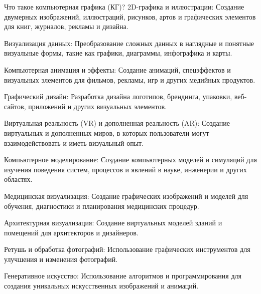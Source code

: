 \documentclass{beamer}
\begin{document}
\begin{frame}{Что такое компьютерная графика (КГ)?}
		2D-графика и иллюстрации: Создание двумерных изображений, иллюстраций, рисунков, артов и графических элементов для книг, журналов, рекламы и дизайна.
		
		Визуализация данных: Преобразование сложных данных в наглядные и понятные визуальные формы, такие как графики, диаграммы, инфографика и карты.
		
		Компьютерная анимация и эффекты: Создание анимаций, спецэффектов и визуальных элементов для фильмов, рекламы, игр и других медийных продуктов.
		
		Графический дизайн: Разработка дизайна логотипов, брендинга, упаковки, веб-сайтов, приложений и других визуальных элементов.
		
		Виртуальная реальность (VR) и дополненная реальность (AR): Создание виртуальных и дополненных миров, в которых пользователи могут взаимодействовать и иметь визуальный опыт.
		
		Компьютерное моделирование: Создание компьютерных моделей и симуляций для изучения поведения систем, процессов и явлений в науке, инженерии и других областях.
		
		Медицинская визуализация: Создание графических изображений и моделей для обучения, диагностики и планирования медицинских процедур.
		
		Архитектурная визуализация: Создание виртуальных моделей зданий и помещений для архитекторов и дизайнеров.
		
		Ретушь и обработка фотографий: Использование графических инструментов для улучшения и изменения фотографий.
		
		Генеративное искусство: Использование алгоритмов и программирования для создания уникальных искусственных изображений и анимаций.
		\fi
		
	\end{frame}
	
\end{document}

